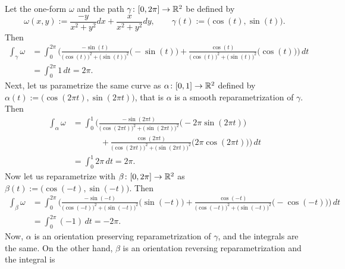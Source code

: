 \begin{example} \label{example:mv:irrotoneformint}
Let the one-form $\omega$ and the path $\gamma \colon [0,2\pi] \to {\mathbb{R}}^2$ be defined by
\begin{equation*}
\omega(x,y) := \frac{-y}{x^2+y^2} dx + \frac{x}{x^2+y^2} dy,
\qquad
\gamma(t) := \bigl(\cos(t),\sin(t)\bigr) .
\end{equation*}
Then
\begin{equation*}
\begin{split}
\int_{\gamma} \omega
& =
\int_0^{2\pi}
\Biggl(
\frac{-\sin(t)}{{\bigl(\cos(t)\bigr)}^2+{\bigl(\sin(t)\bigr)}^2}
\bigl(-\sin(t)\bigr)
+
\frac{\cos(t)}{{\bigl(\cos(t)\bigr)}^2+{\bigl(\sin(t)\bigr)}^2}
\bigl(\cos(t)\bigr)
\Biggr) \, dt
\\
& =
\int_0^{2\pi}
1 \, dt
= 2\pi .
\end{split}
\end{equation*}
Next, let us parametrize the same curve as
$\alpha \colon [0,1] \to {\mathbb{R}}^2$ defined by $\alpha(t) := \bigl(\cos(2\pi
t),\sin(2 \pi t)\bigr)$, that is $\alpha$ is a smooth reparametrization of
$\gamma$.  Then
\begin{equation*}
\begin{split}
\int_{\alpha} \omega
& =
\int_0^{1}
\Biggl(
\frac{-\sin(2\pi t)}{{\bigl(\cos(2\pi t)\bigr)}^2+{\bigl(\sin(2\pi t)\bigr)}^2}
\bigl(-2\pi \sin(2\pi t)\bigr)
\\
& \phantom{=\int_0^1\Biggl(~}
+
\frac{\cos(2 \pi t)}{{\bigl(\cos(2 \pi t)\bigr)}^2+{\bigl(\sin(2 \pi t)\bigr)}^2}
\bigl(2 \pi \cos(2 \pi t)\bigr)
\Biggr) \, dt
\\
& =
\int_0^{1}
2\pi \, dt
= 2\pi .
\end{split}
\end{equation*}
Now let us reparametrize with $\beta \colon [0,2\pi] \to {\mathbb{R}}^2$
as $\beta(t) := \bigl(\cos(-t),\sin(-t)\bigr)$.  Then
\begin{equation*}
\begin{split}
\int_{\beta} \omega
& =
\int_0^{2\pi}
\Biggl(
\frac{-\sin(-t)}{{\bigl(\cos(-t)\bigr)}^2+{\bigl(\sin(-t)\bigr)}^2}
\bigl(\sin(-t)\bigr)
+
\frac{\cos(-t)}{{\bigl(\cos(-t)\bigr)}^2+{\bigl(\sin(-t)\bigr)}^2}
\bigl(-\cos(-t)\bigr)
\Biggr) \, dt
\\
& =
\int_0^{2\pi}
(-1) \, dt
= -2\pi .
\end{split}
\end{equation*}
Now, $\alpha$ is an orientation preserving reparametrization of
$\gamma$, and the integrals are the same.  On the other hand, $\beta$
is an orientation reversing reparametrization and the integral is

\end{example}
